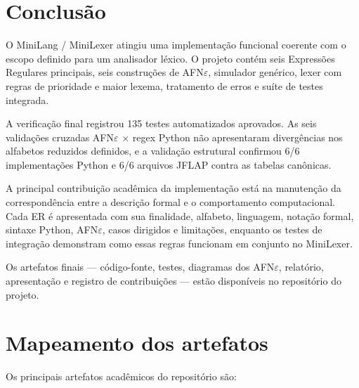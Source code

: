 \documentclass[12pt,a4paper,oneside]{report}
\begin{document}
\chapter{Conclusão}

O MiniLang / MiniLexer atingiu uma implementação funcional coerente com o escopo definido para um analisador léxico. O projeto contém seis Expressões Regulares principais, seis construções de AFN$\varepsilon$, simulador genérico, lexer com regras de prioridade e maior lexema, tratamento de erros e suíte de testes integrada.

A verificação final registrou 135 testes automatizados aprovados. As seis validações cruzadas AFN$\varepsilon$ $\times$ regex Python não apresentaram divergências nos alfabetos reduzidos definidos, e a validação estrutural confirmou 6/6 implementações Python e 6/6 arquivos JFLAP contra as tabelas canônicas.

A principal contribuição acadêmica da implementação está na manutenção da correspondência entre a descrição formal e o comportamento computacional. Cada ER é apresentada com sua finalidade, alfabeto, linguagem, notação formal, sintaxe Python, AFN$\varepsilon$, casos dirigidos e limitações, enquanto os testes de integração demonstram como essas regras funcionam em conjunto no MiniLexer.

Os artefatos finais --- código-fonte, testes, diagramas dos AFN$\varepsilon$, relatório, apresentação e registro de contribuições --- estão disponíveis no repositório do projeto.



\chapter{Mapeamento dos artefatos}

Os principais artefatos acadêmicos do repositório são:
\end{document}
